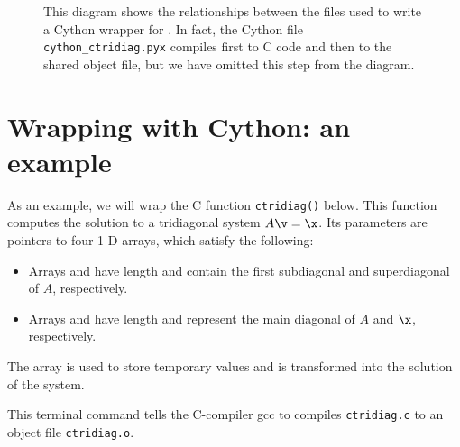 \begin{figure}
\caption{This diagram shows the relationships between the files used to write a Cython wrapper for .
In fact, the Cython file \texttt{cython\_ctridiag.pyx} compiles first to C code and then to the shared object file, but we have omitted this step from the diagram.}
\label{fig:cython_flowchart}
\end{figure}

\section*{Wrapping with Cython: an example}
As an example, we will wrap the C function \texttt{ctridiag()} below.
This function computes the solution to a tridiagonal system $A\v = \x$.
Its parameters are pointers to four 1-D arrays, which satisfy the following:
\begin{itemize}
\item Arrays  and  have length  and contain the first subdiagonal and superdiagonal of $A$, respectively.
\item Arrays  and  have length  and represent the main diagonal of $A$ and $\x$, respectively.
\end{itemize}
The array  is used to store temporary values and  is transformed into the solution of the system.



This terminal command tells the C-compiler gcc to compiles \texttt{ctridiag.c} to an object file \texttt{ctridiag.o}.


